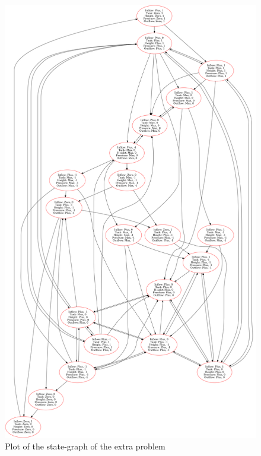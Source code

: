 \documentclass[a4paper]{article}
\begin{document}
\begin{figure}\label{state-graph-extra}
	\centering
	\includegraphics[width=\textwidth,height=\textheight,keepaspectratio]{result_extra_problem.png}
	\caption{Plot of the state-graph of the extra problem}
\end{figure}
\end{document}
